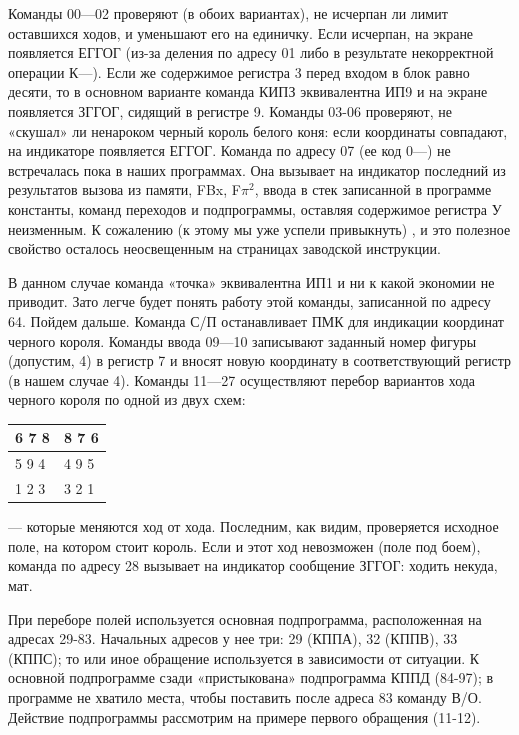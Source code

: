 \documentclass[11pt,a4paper,oneside]{article}
\begin{document}
Команды 00—02 проверяют (в обоих вариантах), не исчерпан ли лимит оставшихся ходов, и уменьшают его на единичку. Если исчерпан, на экране появляется ЕГГОГ (из-за деления по адресу 01 либо в результате некорректной операции К—). Если же содержимое регистра 3 перед входом в блок равно десяти, то в основном варианте команда КИПЗ эквивалентна ИП9 и на экране появляется ЗГГОГ, сидящий в регистре 9. Команды 03-06 проверяют, не «скушал» ли ненароком черный король белого коня: если координаты совпадают, на индикаторе появляется ЕГГОГ. Команда по адресу 07 (ее код 0—) не встречалась пока в наших программах. Она вызывает на индикатор последний из результатов вызова из памяти, FBx, F$\pi^{2}$, ввода в стек записанной в программе константы, команд переходов и подпрограммы, оставляя содержимое регистра У неизменным. К сожалению (к этому мы уже успели привыкнуть) , и это полезное свойство осталось неосвещенным на страницах заводской инструкции.

В данном случае команда «точка» эквивалентна ИП1 и ни к какой экономии не приводит. Зато легче будет понять работу этой команды, записанной по адресу 64. Пойдем дальше. Команда С/П останавливает ПМК для индикации координат черного короля. Команды ввода 09—10 записывают заданный номер фигуры (допустим, 4) в регистр 7 и вносят новую координату в соответствующий регистр (в нашем случае 4). Команды 11—27 осуществляют перебор вариантов хода черного короля по одной из двух схем:
\begin{table}[H]
\begin{tabular}{|l|l|}
\hline
6 7 8 & 8 7 6 \\ \hline
5 9 4 & 4 9 5 \\ \hline
1 2 3 & 3 2 1 \\ \hline
\end{tabular}
\end{table}
— которые меняются ход от хода. Последним, как видим, проверяется исходное поле, на котором стоит король. Если и этот ход невозможен (поле под боем), команда по адресу 28 вызывает на индикатор сообщение ЗГГОГ: ходить некуда, мат.

При переборе полей используется основная подпрограмма, расположенная на адресах 29-83. Начальных адресов у нее три: 29 (КППА), 32 (КППВ), 33 (КППС); то или иное обращение используется в зависимости от ситуации. К основной подпрограмме сзади «пристыкована» подпрограмма КППД (84-97); в программе не хватило места, чтобы поставить после адреса 83 команду В/О. Действие подпрограммы рассмотрим на примере первого обращения (11-12).
\end{document}
